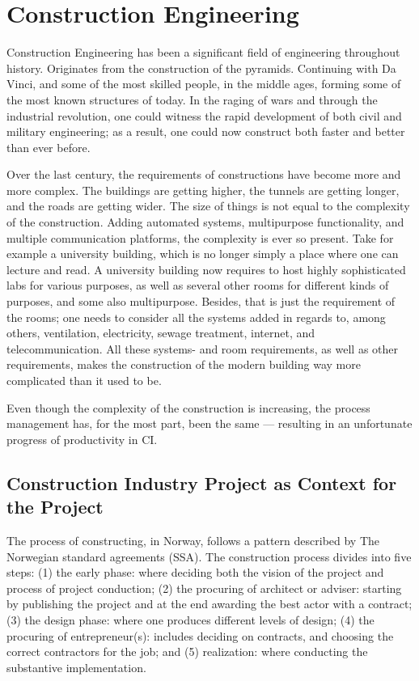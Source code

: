 \section{Construction Engineering}
Construction Engineering has been a significant field of engineering throughout history. Originates from the construction of the pyramids. Continuing with Da Vinci, and some of the most skilled people, in the middle ages, forming some of the most known structures of today. In the raging of wars and through the industrial revolution, one could witness the rapid development of both civil and military engineering; as a result, one could now construct both faster and better than ever before.

Over the last century, the requirements of constructions have become more and more complex. The buildings are getting higher, the tunnels are getting longer, and the roads are getting wider. The size of things is not equal to the complexity of the construction. Adding automated systems, multipurpose functionality, and multiple communication platforms, the complexity is ever so present. Take for example a university building, which is no longer simply a place where one can lecture and read. A university building now requires to host highly sophisticated labs for various purposes, as well as several other rooms for different kinds of purposes, and some also multipurpose. Besides, that is just the requirement of the rooms; one needs to consider all the systems added in regards to, among others, ventilation, electricity, sewage treatment, internet, and telecommunication. All these systems- and room requirements, as well as other requirements, makes the construction of the modern building way more complicated than it used to be. 

Even though the complexity of the construction is increasing, the process management has, for the most part, been the same — resulting in an unfortunate progress of productivity in CI. 

\subsection{Construction Industry Project as Context for the Project}
The process of constructing, in Norway, follows a pattern described by The Norwegian standard agreements (SSA). The construction process divides into five steps: (1) the early phase: where deciding both the vision of the project and process of project conduction; (2) the procuring of architect or adviser: starting by publishing the project and at the end awarding the best actor with a contract; (3) the design phase: where one produces different levels of  design; (4) the procuring of entrepreneur(s): includes deciding on contracts, and choosing the correct contractors for the job; and (5) realization: where conducting the substantive implementation. 

